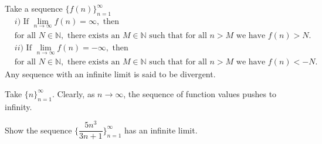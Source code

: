 \begin{definition}
Take a sequence $\{f(n)\}_{n=1}^{\infty}$ 
\begin{align*}
    &i) \hspace{4pt} \text{If} \hspace{4pt} \lim_{n \longrightarrow \infty} f(n) = \infty, \hspace{4pt} \text{then}\\[1ex]
    &\text{for all} \hspace{4pt} N \in \mathbb{N}, \hspace{4pt} \text{there exists an} \hspace{4pt} M \in \mathbb{N} \hspace{4pt} \text{such that for all} \hspace{4pt} n > M \hspace{4pt} \text{we have} \hspace{4pt} f(n) > N. \\[6ex]
    &ii) \hspace{4pt} \text{If} \hspace{4pt} \lim_{n \longrightarrow \infty} f(n) = -\infty, \hspace{4pt} \text{then}\\[1ex]
    &\text{for all} \hspace{4pt} N \in \mathbb{N}, \hspace{4pt} \text{there exists an} \hspace{4pt} M \in \mathbb{N} \hspace{4pt} \text{such that for all} \hspace{4pt} n > M \hspace{4pt} \text{we have} \hspace{4pt} f(n) < -N.
\end{align*}
Any sequence with an infinite limit is said to be divergent.
\label{definition_infinite_limit_sequence}
\end{definition}

\begin{example}
Take $\{n\}_{n=1}^{\infty}$. Clearly, as $n \longrightarrow \infty$, the sequence of function values pushes to infinity.
\end{example}

\begin{exercise}
Show the sequence $\Big\{\dfrac{5n^{3}}{3n+1}\Big\}_{n=1}^{\infty}$ has an infinite limit. 
\end{exercise}

